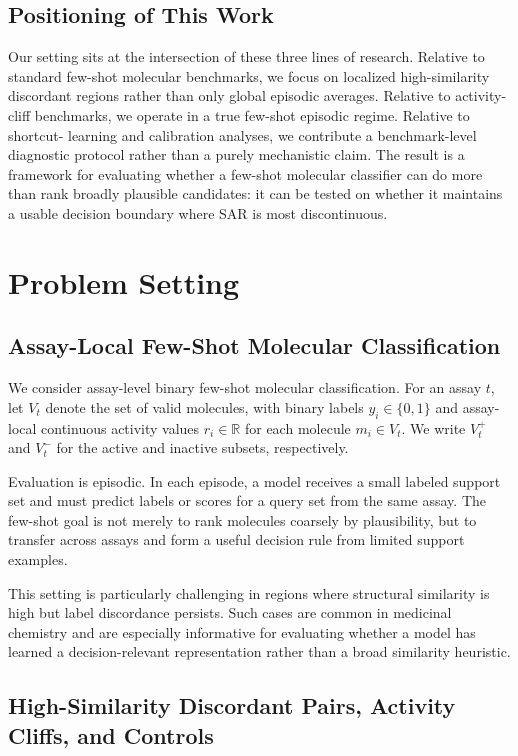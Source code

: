 \documentclass{article}
\begin{document}
\subsection{Positioning of This Work}

Our setting sits at the intersection of these three lines of research. Relative to standard few-shot molecular
benchmarks, we focus on localized high-similarity discordant regions rather than only global episodic averages.
Relative to activity-cliff benchmarks, we operate in a true few-shot episodic regime. Relative to shortcut-
learning and calibration analyses, we contribute a benchmark-level diagnostic protocol rather than a purely
mechanistic claim. The result is a framework for evaluating whether a few-shot molecular classifier can do more
than rank broadly plausible candidates: it can be tested on whether it maintains a usable decision boundary where
SAR is most discontinuous.

\section{Problem Setting}

\subsection{Assay-Local Few-Shot Molecular Classification}

We consider assay-level binary few-shot molecular classification. For an assay $t$, let $V_t$ denote the set of
valid molecules, with binary labels $y_i \in \{0,1\}$ and assay-local continuous activity values $r_i \in
\mathbb{R}$ for each molecule $m_i \in V_t$. We write $V_t^+$ and $V_t^-$ for the active and inactive subsets,
respectively.

Evaluation is episodic. In each episode, a model receives a small labeled support set and must predict labels or
scores for a query set from the same assay. The few-shot goal is not merely to rank molecules coarsely by
plausibility, but to transfer across assays and form a useful decision rule from limited support examples.

This setting is particularly challenging in regions where structural similarity is high but label discordance
persists. Such cases are common in medicinal chemistry and are especially informative for evaluating whether a
model has learned a decision-relevant representation rather than a broad similarity heuristic.

\subsection{High-Similarity Discordant Pairs, Activity Cliffs, and Controls}
\end{document}
